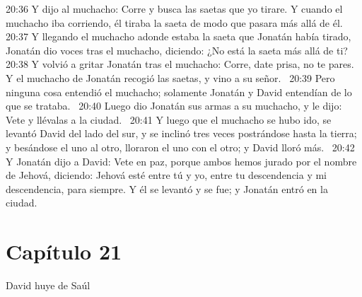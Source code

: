 20:36 Y dijo al muchacho: Corre y busca las saetas que yo tirare. Y cuando el muchacho iba corriendo, él tiraba la saeta de modo que pasara más allá de él.  
20:37 Y llegando el muchacho adonde estaba la saeta que Jonatán había tirado, Jonatán dio voces tras el muchacho, diciendo: ¿No está la saeta más allá de ti?  
20:38 Y volvió a gritar Jonatán tras el muchacho: Corre, date prisa, no te pares. Y el muchacho de Jonatán recogió las saetas, y vino a su señor.  
20:39 Pero ninguna cosa entendió el muchacho; solamente Jonatán y David entendían de lo que se trataba.  
20:40 Luego dio Jonatán sus armas a su muchacho, y le dijo: Vete y llévalas a la ciudad.  
20:41 Y luego que el muchacho se hubo ido, se levantó David del lado del sur, y se inclinó tres veces postrándose hasta la tierra; y besándose el uno al otro, lloraron el uno con el otro; y David lloró más.  
20:42 Y Jonatán dijo a David: Vete en paz, porque ambos hemos jurado por el nombre de Jehová, diciendo: Jehová esté entre tú y yo, entre tu descendencia y mi descendencia, para siempre. Y él se levantó y se fue; y Jonatán entró en la ciudad.  
\section*{Capítulo 21}
David huye de Saúl  

